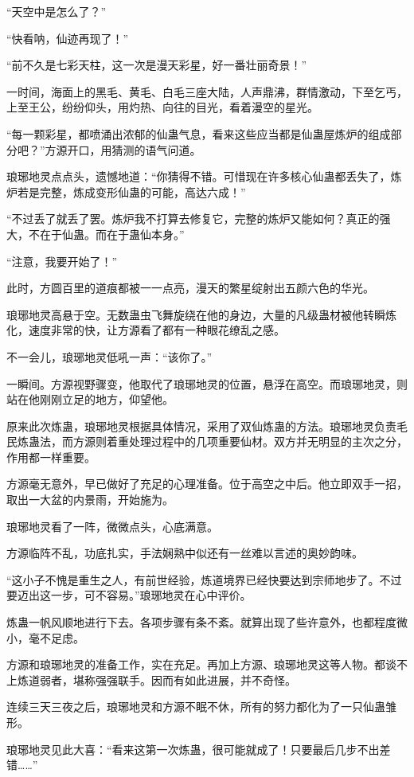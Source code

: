 \begin{this_body}
“天空中是怎么了？”

“快看呐，仙迹再现了！”

“前不久是七彩天柱，这一次是漫天彩星，好一番壮丽奇景！”

一时间，海面上的黑毛、黄毛、白毛三座大陆，人声鼎沸，群情激动，下至乞丐，上至王公，纷纷仰头，用灼热、向往的目光，看着漫空的星光。

“每一颗彩星，都喷涌出浓郁的仙蛊气息，看来这些应当都是仙蛊屋炼炉的组成部分吧？”方源开口，用猜测的语气问道。

琅琊地灵点点头，遗憾地道：“你猜得不错。可惜现在许多核心仙蛊都丢失了，炼炉若是完整，炼成变形仙蛊的可能，高达六成！”

“不过丢了就丢了罢。炼炉我不打算去修复它，完整的炼炉又能如何？真正的强大，不在于仙蛊。而在于蛊仙本身。”

“注意，我要开始了！”

此时，方圆百里的道痕都被一一点亮，漫天的繁星绽射出五颜六色的华光。

琅琊地灵高悬于空。无数蛊虫飞舞旋绕在他的身边，大量的凡级蛊材被他转瞬炼化，速度非常的快，让方源看了都有一种眼花缭乱之感。

不一会儿，琅琊地灵低吼一声：“该你了。”

一瞬间。方源视野骤变，他取代了琅琊地灵的位置，悬浮在高空。而琅琊地灵，则站在他刚刚立足的地方，仰望他。

原来此次炼蛊，琅琊地灵根据具体情况，采用了双仙炼蛊的方法。琅琊地灵负责毛民炼蛊法，而方源则着重处理过程中的几项重要仙材。双方并无明显的主次之分，作用都一样重要。

方源毫无意外，早已做好了充足的心理准备。位于高空之中后。他立即双手一招，取出一大盆的内景雨，开始施为。

琅琊地灵看了一阵，微微点头，心底满意。

方源临阵不乱，功底扎实，手法娴熟中似还有一丝难以言述的奥妙韵味。

“这小子不愧是重生之人，有前世经验，炼道境界已经快要达到宗师地步了。不过要迈出这一步，可不容易。”琅琊地灵在心中评价。

炼蛊一帆风顺地进行下去。各项步骤有条不紊。就算出现了些许意外，也都程度微小，毫不足虑。

方源和琅琊地灵的准备工作，实在充足。再加上方源、琅琊地灵这等人物。都谈不上炼道弱者，堪称强强联手。因而有如此进展，并不奇怪。

连续三天三夜之后，琅琊地灵和方源不眠不休，所有的努力都化为了一只仙蛊雏形。

琅琊地灵见此大喜：“看来这第一次炼蛊，很可能就成了！只要最后几步不出差错……”


\end{this_body}
